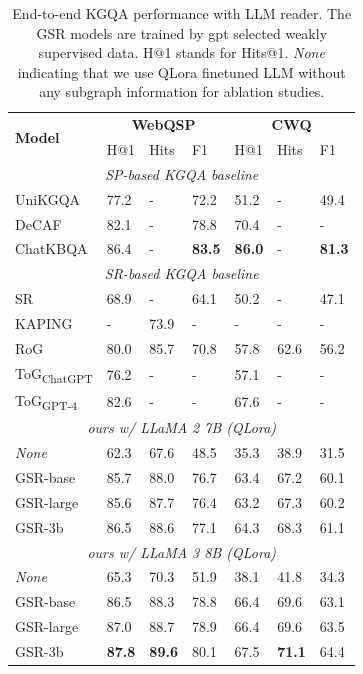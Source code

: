 \begin{table}[t]
    \centering
    \small
    \begin{tabular}{l|p{0.5cm}p{0.5cm}p{0.6cm}|p{0.5cm}p{0.5cm}p{0.5cm}}
    \toprule
        \multirow{2}{*}{\bf{Model}} & \multicolumn{3}{c}{\bf{WebQSP}} & \multicolumn{3}{|c}{\bf{CWQ}} \\ 
        & H@1 & Hits & F1 & H@1 & Hits & F1 \\ \midrule
        \multicolumn{7}{c}{\textit{SP-based KGQA baseline}} \\ \midrule
        UniKGQA & 77.2 & - & 72.2 & 51.2 & - & 49.4\\
        DeCAF & 82.1 & - & 78.8 & 70.4 & - & - \\
        ChatKBQA & 86.4 & - & \textbf{83.5} & \textbf{86.0} & - & \textbf{81.3} \\
        \midrule
        \multicolumn{7}{c}{\textit{SR-based KGQA baseline}} \\ 
        \midrule
        SR & 68.9 & - & 64.1 & 50.2 & - & 47.1 \\
        KAPING & - & 73.9 & - & - & - & - \\
        RoG & 80.0 & 85.7 & 70.8 & 57.8 & 62.6 & 56.2 \\
        ToG\textsubscript{ChatGPT} & 76.2 & - & - & 57.1 & - & -\\ 
        ToG\textsubscript{GPT-4} & 82.6 & - & - & 67.6 & - & -\\ \midrule
        
        \multicolumn{7}{c}{\textit{ours w/ LLaMA 2 7B (QLora)}} \\ \midrule
        \it{None} & 62.3 & 67.6 & 48.5 & 35.3 & 38.9 & 31.5 \\ 
        GSR-base & 85.7 & 88.0 & 76.7 & 63.4 & 67.2 & 60.1 \\
        GSR-large & 85.6 & 87.7 & 76.4 & 63.2 & 67.3 & 60.2 \\
        GSR-3b & 86.5 & 88.6 & 77.1 & 64.3 & 68.3 & 61.1 \\ 
        \midrule
        \multicolumn{7}{c}{\textit{ours w/ LLaMA 3 8B (QLora)}} \\ \midrule
        \it{None} & 65.3 & 70.3 & 51.9 & 38.1 & 41.8 & 34.3 \\
        GSR-base & 86.5 & 88.3 & 78.8 & 66.4 & 69.6 & 63.1 \\
        GSR-large & 87.0 & 88.7 & 78.9 & 66.4 & 69.6 & 63.5 \\
        GSR-3b & \textbf{87.8} & \textbf{89.6} & 80.1 & 67.5 & \textbf{71.1} & 64.4 \\
        \bottomrule
    \end{tabular}
\caption{End-to-end KGQA performance with LLM reader. The GSR models are trained by gpt selected weakly supervised data. H@1 stands for Hits@1. \textit{None} indicating that we use QLora finetuned LLM without any subgraph information for ablation studies.}
    \label{tab:end_to_end_res}
\end{table}
